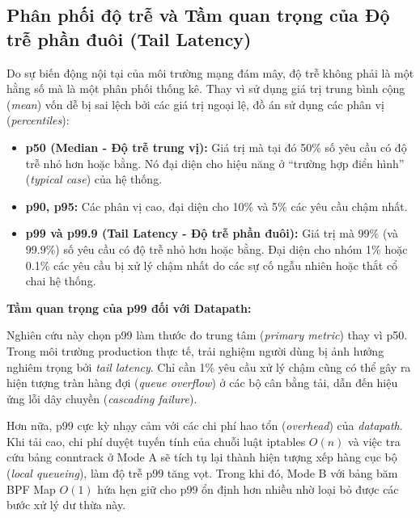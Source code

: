 \subsection{Phân phối độ trễ và Tầm quan trọng của Độ trễ phần đuôi (Tail Latency)}

Do sự biến động nội tại của môi trường mạng đám mây, độ trễ không phải là một hằng số mà là một phân phối thống kê. Thay vì sử dụng giá trị trung bình cộng (\textit{mean}) vốn dễ bị sai lệch bởi các giá trị ngoại lệ, đồ án sử dụng các phân vị (\textit{percentiles}):

\begin{itemize}
    \item \textbf{p50 (Median - Độ trễ trung vị):} Giá trị mà tại đó 50\% số yêu cầu có độ trễ nhỏ hơn hoặc bằng. Nó đại diện cho hiệu năng ở ``trường hợp điển hình'' (\textit{typical case}) của hệ thống.
    \item \textbf{p90, p95:} Các phân vị cao, đại diện cho 10\% và 5\% các yêu cầu chậm nhất.
    \item \textbf{p99 và p99.9 (Tail Latency - Độ trễ phần đuôi):} Giá trị mà 99\% (và 99.9\%) số yêu cầu có độ trễ nhỏ hơn hoặc bằng. Đại diện cho nhóm 1\% hoặc 0.1\% các yêu cầu bị xử lý chậm nhất do các sự cố ngẫu nhiên hoặc thắt cổ chai hệ thống.
\end{itemize}

\noindent \textbf{Tầm quan trọng của p99 đối với Datapath:} 

Nghiên cứu này chọn p99 làm thước đo trung tâm (\textit{primary metric}) thay vì p50. Trong môi trường production thực tế, trải nghiệm người dùng bị ảnh hưởng nghiêm trọng bởi \textit{tail latency}. Chỉ cần 1\% yêu cầu xử lý chậm cũng có thể gây ra hiện tượng tràn hàng đợi (\textit{queue overflow}) ở các bộ cân bằng tải, dẫn đến hiệu ứng lỗi dây chuyền (\textit{cascading failure}). 

Hơn nữa, p99 cực kỳ nhạy cảm với các chi phí hao tổn (\textit{overhead}) của \textit{datapath}. Khi tải cao, chi phí duyệt tuyến tính của chuỗi luật iptables $O(n)$ và việc tra cứu bảng conntrack ở Mode A sẽ tích tụ lại thành hiện tượng xếp hàng cục bộ (\textit{local queueing}), làm độ trễ p99 tăng vọt. Trong khi đó, Mode B với bảng băm BPF Map $O(1)$ hứa hẹn giữ cho p99 ổn định hơn nhiều nhờ loại bỏ được các bước xử lý dư thừa này.
